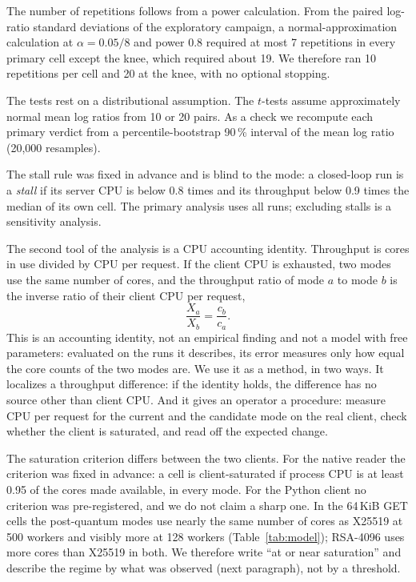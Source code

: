\documentclass[conference]{IEEEtran}
\begin{document}
The number of repetitions follows from a power calculation. From the paired log-ratio standard deviations of the exploratory campaign, a
normal-approximation calculation at $\alpha=0.05/8$ and power 0.8 required at most 7 repetitions
in every primary cell except the knee, which required about 19. We therefore ran 10 repetitions
per cell and 20 at the knee, with no optional stopping.

The tests rest on a distributional assumption. The $t$-tests assume approximately normal mean log ratios
from 10 or 20 pairs. As a check we recompute each primary verdict from a percentile-bootstrap
90\,\% interval of the mean log ratio (20{,}000 resamples).

The stall rule was fixed in advance and is blind to the mode: a closed-loop run is a \emph{stall}
if its server CPU is below 0.8 times and its throughput below 0.9 times the median of its own
cell. The primary analysis uses all runs; excluding stalls is a sensitivity analysis.

The second tool of the analysis is a CPU accounting identity.
Throughput is cores in use divided by CPU per request. If the client CPU is exhausted, two modes
use the same number of cores, and the throughput ratio of mode $a$ to mode $b$ is the inverse
ratio of their client CPU per request,
\[\frac{X_a}{X_b}=\frac{c_b}{c_a}.\]
This is an accounting identity, not an empirical finding and not a model with free parameters:
evaluated on the runs it describes, its error measures only how equal the core counts of the two
modes are. We use it as a method, in two ways. It localizes a throughput difference: if the
identity holds, the difference has no source other than client CPU. And it gives an operator a
procedure: measure CPU per request for the current and the candidate mode on the real client,
check whether the client is saturated, and read off the expected change.

The saturation criterion differs between the two clients. For the native reader the criterion was fixed in advance: a cell
is client-saturated if process CPU is at least 0.95 of the cores made available, in every mode.
For the Python client no criterion was pre-registered, and we do not claim a sharp one. In the
64\,KiB GET cells the post-quantum modes use nearly the same number of cores as X25519 at 500
workers and visibly more at 128 workers (Table~\ref{tab:model}); RSA-4096 uses more cores than
X25519 in both. We therefore write ``at or near saturation'' and describe the regime by what
was observed (next paragraph), not by a threshold.
\end{document}

